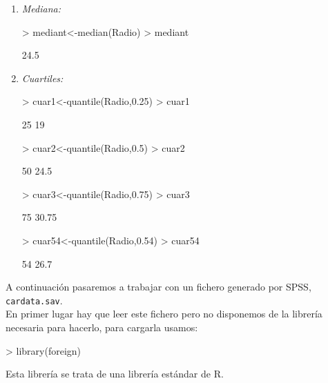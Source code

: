 \documentclass [a4paper] {article}
\begin{document}
\begin{enumerate}
\item
\textit{Mediana:}
\begin{Schunk}
\begin{Sinput}
> mediant<-median(Radio)
> mediant
\end{Sinput}
\begin{Soutput}
[1] 24.5
\end{Soutput}
\end{Schunk}

\item
\textit{Cuartiles:}
\begin{Schunk}
\begin{Sinput}
> cuar1<-quantile(Radio,0.25)
> cuar1
\end{Sinput}
\begin{Soutput}
25%
 19 
\end{Soutput}
\begin{Sinput}
> cuar2<-quantile(Radio,0.5)
> cuar2
\end{Sinput}
\begin{Soutput}
 50%
24.5 
\end{Soutput}
\begin{Sinput}
> cuar3<-quantile(Radio,0.75)
> cuar3
\end{Sinput}
\begin{Soutput}
  75%
30.75 
\end{Soutput}
\begin{Sinput}
> cuar54<-quantile(Radio,0.54)
> cuar54
\end{Sinput}
\begin{Soutput}
 54%
26.7 
\end{Soutput}
\end{Schunk}
\end{enumerate}

\bigskip
A continuaci\'on pasaremos a trabajar con un fichero generado por SPSS, 
\texttt{cardata.sav}.\\

\bigskip
En primer lugar hay que leer este fichero pero no disponemos de la librer\'ia
necesaria para hacerlo, para cargarla usamos:
\begin{Schunk}
\begin{Sinput}
> library(foreign)
\end{Sinput}
\end{Schunk}
Esta librer\'ia se trata de una librer\'ia est\'andar de R.
\end{document}
